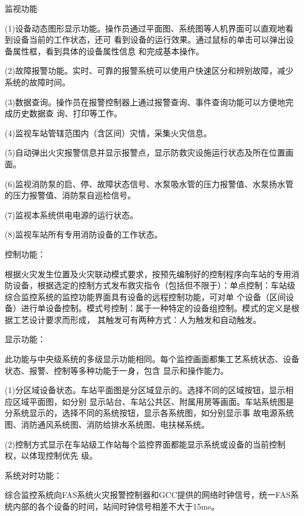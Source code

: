 监视功能

(1)设备动态图形显示功能。操作员通过平面图、系统图等人机界面可以直观地看到设备当前的工作状态，还可 看到设备的运行效果。通过鼠标的单击可以弹出设备属性框，看到具体的设备属性信息 和完成基本操作。\par
(2)故障报警功能。实时、可靠的报警系统可以使用户快速区分和辨别故障，减少系统的故障时间。\par
(3)数据查询。操作员在报警控制器上通过报警查询、事件查询功能可以方便地完成历史数据查 询、打印等工作。\par
(4)监视车站管辖范围内（含区间）灾情，采集火灾信息。\par
(5)自动弹出火灾报警信息并显示报警点，显示防救灾设施运行状态及所在位置画 面。\par
(6)监视消防泵的启、停、故障状态信号、水泵吸水管的压力报警值、水泵扬水管 的压力报警值、消防泵自巡检信号。\par
(7)监视本系统供电电源的运行状态。\par
(8)监视车站所有专用消防设备的工作状态。

控制功能：

根据火灾发生位置及火灾联动模式要求，按预先编制好的控制程序向车站的专用消 防设备，根据选定的控制方式发布救灾指令（包括但不限于）：单点控制：车站级综合监控系统的监控功能界面具有设备的远程控制功能，可对单 个设备（区间设备）进行单设备控制。模式号控制：属于一种特定的设备组控制。模式的定义是根据工艺设计要求而形成， 其触发可有两种方式：人为触发和自动触发。

显示功能：

此功能与中央级系统的多级显示功能相同。每个监控画面都集工艺系统状态、设备状态、报警、控制等多种功能于一身，包含 显示和操作能力。\par
(1)分区域设备状态。车站平面图是分区域显示的。选择不同的区域按钮，显示相应区域平面图，如分别 显示站台、车站公共区、附属用房等画面。车站系统图是分系统显示的，选择不同的系统按钮，显示各系统图，如分别显示事 故电源系统图、消防通风系统图、消防给排水系统图、电扶梯系统。\par
(2)控制方式显示在车站级工作站每个监控界面都能显示系统或设备的当前控制权，以体现控制优先 级。

系统对时功能：

综合监控系统向FAS系统火灾报警控制器和GCC提供的网络时钟信号，统一FAS系 统内部的各个设备的时间，站间时钟信号相差不大于15ms。

